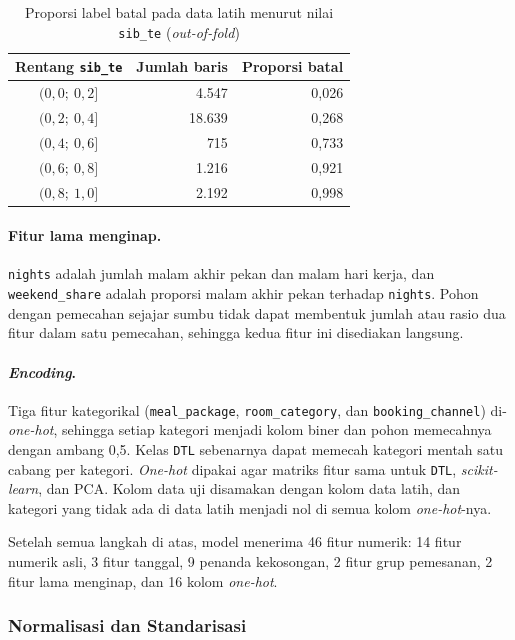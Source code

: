\begin{table}[H]
	\centering
	\caption{Proporsi label batal pada data latih menurut nilai \texttt{sib\_te} (\textit{out-of-fold})}
	\label{tab:dtl-sibling}
	\begin{tabular}{c r r}
		\toprule
		\textbf{Rentang \texttt{sib\_te}} & \textbf{Jumlah baris} & \textbf{Proporsi batal} \\
		\midrule
		$(0{,}0;\ 0{,}2]$ & 4.547 & 0,026 \\
		$(0{,}2;\ 0{,}4]$ & 18.639 & 0,268 \\
		$(0{,}4;\ 0{,}6]$ & 715 & 0,733 \\
		$(0{,}6;\ 0{,}8]$ & 1.216 & 0,921 \\
		$(0{,}8;\ 1{,}0]$ & 2.192 & 0,998 \\
		\bottomrule
	\end{tabular}
\end{table}

\paragraph{Fitur lama menginap.} \texttt{nights} adalah jumlah malam akhir pekan dan malam hari kerja,
dan \texttt{weekend\_share} adalah proporsi malam akhir pekan terhadap \texttt{nights}. Pohon dengan
pemecahan sejajar sumbu tidak dapat membentuk jumlah atau rasio dua fitur dalam satu pemecahan,
sehingga kedua fitur ini disediakan langsung.

\paragraph{\textit{Encoding}.} Tiga fitur kategorikal (\texttt{meal\_package},
\texttt{room\_category}, dan \texttt{booking\_channel}) di-\textit{one-hot}, sehingga setiap kategori
menjadi kolom biner dan pohon memecahnya dengan ambang 0,5. Kelas \texttt{DTL} sebenarnya dapat
memecah kategori mentah satu cabang per kategori. \textit{One-hot} dipakai agar matriks fitur sama
untuk \texttt{DTL}, \textit{scikit-learn}, dan PCA. Kolom data uji disamakan dengan kolom data latih,
dan kategori yang tidak ada di data latih menjadi nol di semua kolom \textit{one-hot}-nya.

Setelah semua langkah di atas, model menerima 46 fitur numerik: 14 fitur numerik asli, 3 fitur
tanggal, 9 penanda kekosongan, 2 fitur grup pemesanan, 2 fitur lama menginap, dan 16 kolom
\textit{one-hot}.

\subsubsection{Normalisasi dan Standarisasi}

